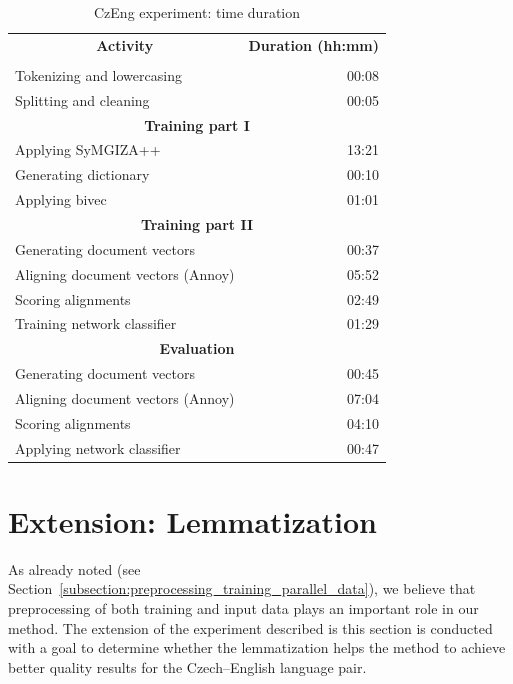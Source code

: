 \begin{table}[!htb]
	\centering
	\caption{CzEng experiment: time duration}
	\label{table:czeng_time_duration}
	\vspace{1em}
	\begin{tabular}{|l|r|}
		\hline
		\multicolumn{1}{|c|}{\textbf{Activity}} & \multicolumn{1}{c|}{\textbf{Duration (hh:mm)}} \\
		\hhline{|=|=|}
		\multicolumn{2}{|c|}{\textbf{Preprocessing}} \\
		\hline
		Tokenizing and lowercasing & 00:08 \\
		Splitting and cleaning & 00:05 \\
		\hline
		\multicolumn{2}{|c|}{\textbf{Training part I}} \\
		\hline
		Applying SyMGIZA++ & 13:21 \\
		Generating dictionary & 00:10 \\
		Applying bivec & 01:01 \\
		\hline
		\multicolumn{2}{|c|}{\textbf{Training part II}} \\ 
		\hline
		Generating document vectors & 00:37 \\
		Aligning document vectors (Annoy) & 05:52 \\
		Scoring alignments & 02:49 \\
		Training network classifier & 01:29 \\
		\hline
		\multicolumn{2}{|c|}{\textbf{Evaluation}} \\
		\hline
		Generating document vectors & 00:45 \\
		Aligning document vectors (Annoy) & 07:04 \\
		Scoring alignments & 04:10 \\
		Applying network classifier & 00:47 \\
		\hline
	\end{tabular}
\end{table}

\section{Extension: Lemmatization}
\label{section:czeng_experiment_extension}

As already noted (see Section~\ref{subsection:preprocessing_training_parallel_data}), we believe that preprocessing of both training and input data plays an important role in our method. The extension of the experiment described is this section is conducted with a goal to determine whether the lemmatization helps the method to achieve better quality results for the Czech--English language pair.

